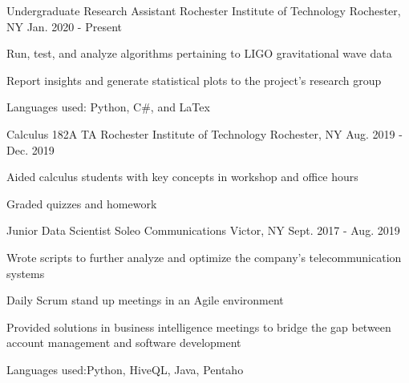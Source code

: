 \begin{cventries}

    \cventry
    {Undergraduate Research Assistant}
    {Rochester Institute of Technology}
    {Rochester, NY}
    {Jan. 2020 - Present}
    {
      \begin{cvitems}
        \item {Run, test, and analyze algorithms pertaining to LIGO gravitational wave data}
        \item {Report insights and generate statistical plots to the project's research group}
        \item {Languages used: Python, C#, and LaTex}
      \end{cvitems}
    }
    \cventry
    {Calculus 182A TA}
    {Rochester Institute of Technology}
    {Rochester, NY}
    {Aug. 2019 - Dec. 2019}
    {
      \begin{cvitems}
        \item {Aided calculus students with key concepts in workshop and office hours}
        \item {Graded quizzes and homework}
      \end{cvitems}
    }
  \cventry
    {Junior Data Scientist}
    {Soleo Communications}
    {Victor, NY}
    {Sept. 2017 - Aug. 2019}
    {
      \begin{cvitems}
        \item {Wrote scripts to further analyze and optimize the company's telecommunication systems}
        \item {Daily Scrum stand up meetings in an Agile environment}
        \item {Provided solutions in business intelligence meetings to bridge the gap between account management and software development}
        \item{Languages used:Python, HiveQL, Java, Pentaho}
      \end{cvitems}
    }


\end{cventries}
